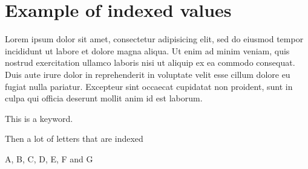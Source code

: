 \chapter{Example of indexed values}

Lorem ipsum dolor sit amet, consectetur adipisicing elit, sed do eiusmod tempor incididunt ut labore et dolore magna aliqua. Ut enim ad minim veniam,
quis nostrud exercitation ullamco laboris nisi ut aliquip ex ea commodo consequat. Duis aute irure dolor in reprehenderit in voluptate velit esse
cillum dolore eu fugiat nulla pariatur. Excepteur sint occaecat cupidatat non proident, sunt in culpa qui officia deserunt mollit anim id est laborum.

This is a keyword.


Then a lot of letters that are indexed

A, B, C, D, E, F and G


